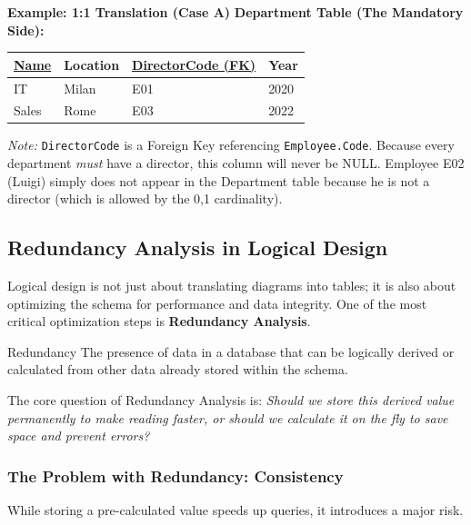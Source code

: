 \begin{example}{\textbf{Example: 1:1 Translation (Case A)}}
\vspace{0.3cm}
\textbf{Department Table (The Mandatory Side):}

\vspace{0.25cm}
\begin{center}
\begin{tabular}{|l|l|l|l|}
\hline
\textbf{\underline{Name}} & \textbf{Location} & \textbf{\underline{DirectorCode (FK)}} & \textbf{Year} \\
\hline
IT & Milan & E01 & 2020 \\
Sales & Rome & E03 & 2022 \\
\hline
\end{tabular}
\end{center}

\vspace{0.3cm}

\textit{Note:} \texttt{DirectorCode} is a Foreign Key referencing \texttt{Employee.Code}. Because every department \textit{must} have a director, this column will never be NULL. Employee E02 (Luigi) simply does not appear in the Department table because he is not a director (which is allowed by the 0,1 cardinality).
\end{example}

\subsection{Redundancy Analysis in Logical Design}


Logical design is not just about translating diagrams into tables; it is also about optimizing the schema for performance and data integrity. One of the most critical optimization steps is \textbf{Redundancy Analysis}.

\begin{defbox}{Redundancy}
The presence of data in a database that can be logically derived or calculated from other data already stored within the schema.
\end{defbox}

The core question of Redundancy Analysis is: \textit{Should we store this derived value permanently to make reading faster, or should we calculate it on the fly to save space and prevent errors?}

\subsubsection{The Problem with Redundancy: Consistency}
While storing a pre-calculated value speeds up queries, it introduces a major risk.

